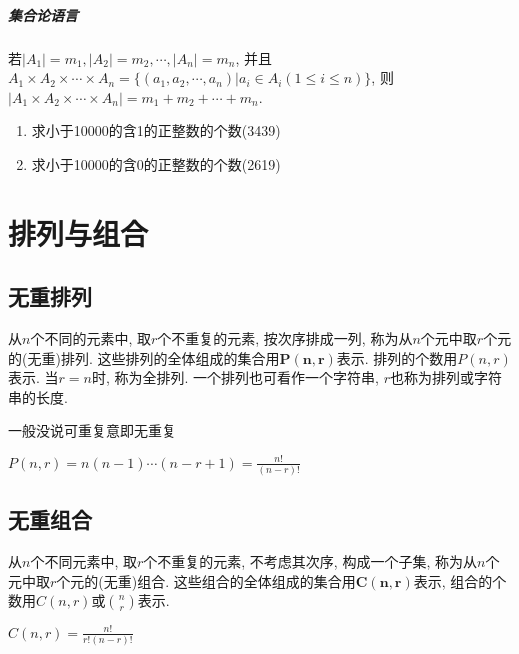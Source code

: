         \subparagraph{集合论语言}

            若$|A_1|=m_1, |A_2|=m_2, \cdots, |A_n|=m_n$, 并且$A_1\times A_2\times \cdots \times A_n=\{(a_1,a_2,\cdots,a_n)|a_i\in A_i(1\leqslant i\leqslant n)\}$, 则$|A_1\times A_2\times\cdots\times A_n|=m_1+m_2+\cdots+m_n$.

        \begin{example}
            \begin{enumerate}
                \item 求小于10000的含1的正整数的个数(3439)
                \item 求小于10000的含0的正整数的个数(2619)
            \end{enumerate}
        \end{example}

\section{排列与组合}

    \subsection{无重排列}

        \begin{definition}[无重排列]
            从$n$个不同的元素中, 取$r$个不重复的元素, 按次序排成一列, 称为从$n$个元中取$r$个元的\textsf{(无重)排列}. 这些排列的全体组成的集合用$\mathbf{P(n,r)}$表示. 排列的个数用$P(n,r)$表示. 当$r=n$时, 称为\textsf{全排列}. 一个排列也可看作一个字符串, $r$也称为排列或字符串的长度. 
        \end{definition}

        \begin{caution}
            一般没说可重复意即无重复
        \end{caution}

        \begin{theorem}
            $P(n,r)=n(n-1)\cdots(n-r+1)=\frac{n!}{(n-r)!}$
        \end{theorem}

    \subsection{无重组合}

        \begin{definition}[无重组合]
            从$n$个不同元素中, 取$r$个不重复的元素, 不考虑其次序, 构成一个子集, 称为从$n$个元中取$r$个元的\textsf{(无重)组合}. 这些组合的全体组成的集合用$\mathbf{C(n,r)}$表示, 组合的个数用$C(n,r)$或$n\choose r$表示.
        \end{definition}
        \begin{theorem}
            $C(n,r)=\frac{n!}{r!(n-r)!}$
        \end{theorem}

